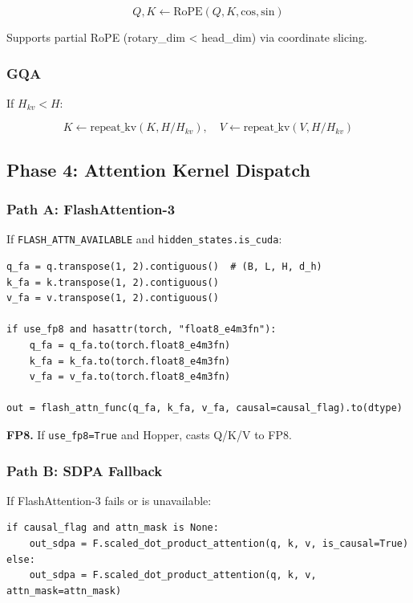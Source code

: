 \[
Q, K \leftarrow \text{RoPE}(Q, K, \text{cos}, \text{sin})
\tag{4.2}
\]

Supports partial RoPE (rotary\_dim < head\_dim) via coordinate slicing.

\subsubsection{GQA}

If $H_{kv} < H$:

\[
K \leftarrow \text{repeat\_kv}(K, H/H_{kv}), \quad
V \leftarrow \text{repeat\_kv}(V, H/H_{kv})
\tag{4.3}
\]

\subsection{Phase 4: Attention Kernel Dispatch}

\subsubsection{Path A: FlashAttention-3}

If \texttt{FLASH\_ATTN\_AVAILABLE} and \texttt{hidden\_states.is\_cuda}:

\begin{lstlisting}
q_fa = q.transpose(1, 2).contiguous()  # (B, L, H, d_h)
k_fa = k.transpose(1, 2).contiguous()
v_fa = v.transpose(1, 2).contiguous()

if use_fp8 and hasattr(torch, "float8_e4m3fn"):
    q_fa = q_fa.to(torch.float8_e4m3fn)
    k_fa = k_fa.to(torch.float8_e4m3fn)
    v_fa = v_fa.to(torch.float8_e4m3fn)

out = flash_attn_func(q_fa, k_fa, v_fa, causal=causal_flag).to(dtype)
\end{lstlisting}

\textbf{FP8.} If \texttt{use\_fp8=True} and Hopper, casts Q/K/V to FP8.

\subsubsection{Path B: SDPA Fallback}

If FlashAttention-3 fails or is unavailable:

\begin{lstlisting}
if causal_flag and attn_mask is None:
    out_sdpa = F.scaled_dot_product_attention(q, k, v, is_causal=True)
else:
    out_sdpa = F.scaled_dot_product_attention(q, k, v, attn_mask=attn_mask)
\end{lstlisting}

